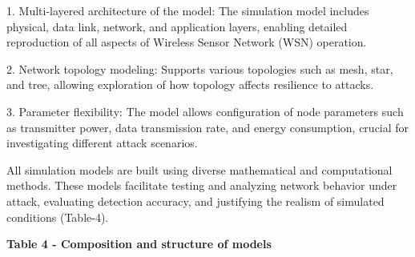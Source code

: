 1. Multi-layered architecture of the model: The simulation model
includes physical, data link, network, and application layers, enabling
detailed reproduction of all aspects of Wireless Sensor Network (WSN)
operation.

2. Network topology modeling: Supports various topologies such as mesh,
star, and tree, allowing exploration of how topology affects resilience
to attacks.

3. Parameter flexibility: The model allows configuration of node
parameters such as transmitter power, data transmission rate, and energy
consumption, crucial for investigating different attack scenarios.

All simulation models are built using diverse mathematical and
computational methods. These models facilitate testing and analyzing
network behavior under attack, evaluating detection accuracy, and
justifying the realism of simulated conditions (Table-4).

{\bfseries Table 4 - Composition and structure of models}

